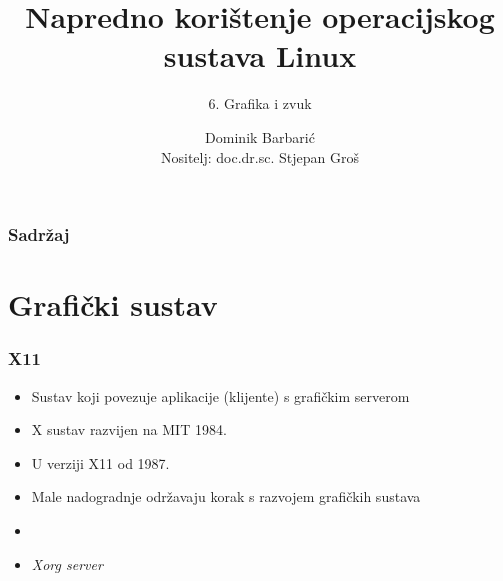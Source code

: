 \documentclass[t,table,usenames,dvipsnames]{beamer}
\date{\todayiso}
\title[NKOSL]{Napredno korištenje operacijskog sustava Linux}
\author[Dominik Barbarić]{Dominik Barbarić\\{\small Nositelj: doc.dr.sc. Stjepan Groš}}
\subtitle{6. Grafika i zvuk}
\institute[FER]{Sveučilište u Zagrebu\\Fakultet elektrotehnike i računarstva}
\begin{document}
{
	\begin{frame}
		\maketitle
	\end{frame}
}

\begin{frame}
	\frametitle{Sadržaj}
	\tableofcontents
\end{frame}



\section{Grafički sustav}


\begin{frame}
	\frametitle{X11}
	\begin{itemize}
		\item Sustav koji povezuje aplikacije (klijente) s grafičkim serverom
		\item X sustav razvijen na MIT 1984. 
		\item U verziji X11 od 1987.  
		\item Male nadogradnje održavaju korak s razvojem grafičkih sustava
		\item[]
		\item \emph{Xorg server}
	\end{itemize}
\end{frame}
\end{document}
